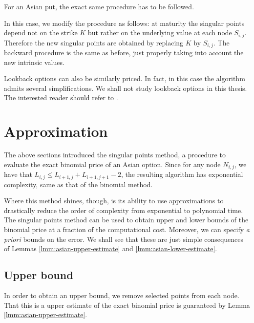 \begin{rem}[put]
	For an Asian put, the exact same procedure has to be followed.
\end{rem}

\begin{rem}[floating]
	In this case, we modify the procedure as follows: at maturity the singular points depend not on the strike $ K $ but rather on the underlying value at each node $ S_{i,j} $. Therefore the new singular points are obtained by replacing $ K $ by $ S_{i,j} $. The backward procedure is the same as before, just properly taking into account the new intrinsic values.
\end{rem}

\begin{rem}
	Lookback options can also be similarly priced. In fact, in this case the algorithm admits several simplifications. We shall not study lookback options in this thesis. The interested reader should refer to \cite[Section 4]{Gaudenzi2010}.
\end{rem}


\section{Approximation}
\label{sec:asian-approx}
The above sections introduced the singular points method, a procedure to evaluate the exact binomial price of an Asian option. Since for any node $ N_{i,j} $, we have that $ L_{i,j} \le L_{i+1,j} + L_{i+1,j+1} - 2 $, the resulting algorithm has exponential complexity, same as that of the binomial method.

Where this method shines, though, is its ability to use approximations to drastically reduce the order of complexity from exponential to polynomial time. The singular points method can be used to obtain upper and lower bounds of the binomial price at a fraction of the computational cost. Moreover, we can specify \emph{a priori} bounds on the error. We shall see that these are just simple consequences of Lemmas \ref{lmm:asian-upper-estimate} and \ref{lmm:asian-lower-estimate}.

\subsection{Upper bound}
\label{subsec:asian-ub}
In order to obtain an upper bound, we remove selected points from each node. That this is a upper estimate of the exact binomial price is guaranteed by Lemma \ref{lmm:asian-upper-estimate}.


